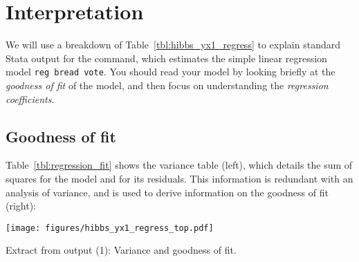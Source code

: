 %
%
%
\section{Interpretation}

We will use a breakdown of Table~\ref{tbl:hibbs_yx1_regress} to explain standard Stata output for the  command, which estimates the simple linear regression model \texttt{reg bread vote}. You should read your model by looking briefly at the \emph{goodness of fit} of the model, and then focus on understanding the \emph{regression coefficients}.

% 	
% 

	\subsection{Goodness of fit}

	\label{sec:goodness}%
	Table~\ref{tbl:regression_fit} shows the variance table (left), which details the sum of squares for the model and for its residuals. This information is redundant with an analysis of variance, and is used to derive information on the goodness of fit (right):

	\begin{table}[htp]
		\texttt{[image: figures/hibbs\_yx1\_regress\_top.pdf]}

	  	\caption[Extract from  output (1): Variance and goodness of fit]{\label{tbl:regression_fit}
		Extract from  output (1): Variance and goodness of fit.\\
		}
	\end{table}%

